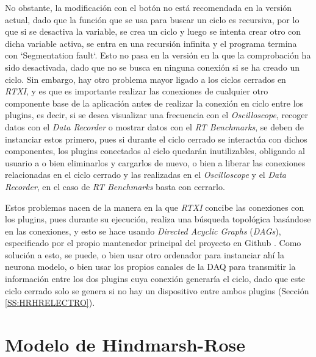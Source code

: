 No obstante, la modificación con el botón no está recomendada en la versión actual, dado que la función que se usa para buscar un ciclo es recursiva, por lo que si se desactiva la variable, se crea un ciclo y luego se intenta crear otro con dicha variable activa, se entra en una recursión infinita y el programa termina con `Segmentation fault`. Esto no pasa en la versión en la que la comprobación ha sido desactivada, dado que no se busca en ninguna conexión si se ha creado un ciclo. Sin embargo, hay otro problema mayor ligado a los ciclos cerrados en \textit{RTXI}, y es que es importante realizar las conexiones de cualquier otro componente base de la aplicación antes de realizar la conexión en ciclo entre los plugins, es decir, si se desea visualizar una frecuencia con el \textit{Oscilloscope}, recoger datos con el \textit{Data Recorder} o mostrar datos con el \textit{RT Benchmarks}, se deben de instanciar estos primero, pues si durante el ciclo cerrado se interactúa con dichos componentes, los plugins conectados al ciclo quedarán inutilizables, obligando al usuario a o bien eliminarlos y cargarlos de nuevo, o bien a liberar las conexiones relacionadas en el ciclo cerrado y las realizadas en el \textit{Oscilloscope} y el \textit{Data Recorder}, en el caso de \textit{RT Benchmarks} basta con cerrarlo.

Estos problemas nacen de la manera en la que \textit{RTXI} concibe las conexiones con los plugins, pues durante su ejecución, realiza una búsqueda topológica basándose en las conexiones, y esto se hace usando  \textit{Directed Acyclic Graphs} (\textit{DAGs}), especificado por el propio mantenedor principal del proyecto en Github \cite{IvanFValerio2024}. Como solución a esto, se puede, o bien usar otro ordenador para instanciar ahí la neurona modelo, o bien usar los propios canales de la DAQ para transmitir la información entre los dos plugins cuya conexión generaría el ciclo, dado que este ciclo cerrado solo se genera si no hay un dispositivo entre ambos plugins (Sección \ref{SS:HRHRELECTRO}).




\section{Modelo de Hindmarsh-Rose\label{SEC:HINDMARSHROSE}}


